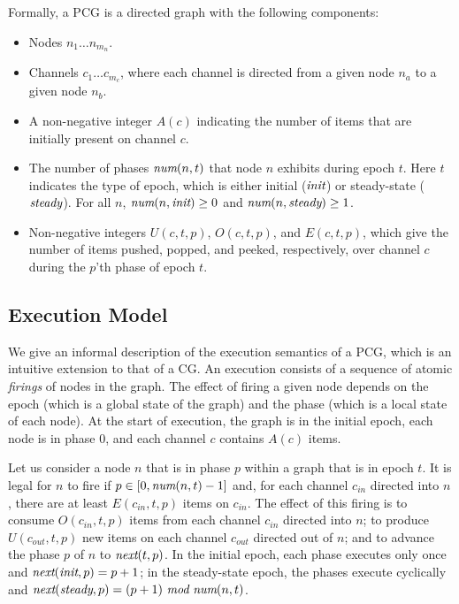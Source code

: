 Formally, a PCG is a directed graph with the following components:
\begin{itemize}

\item Nodes $n_1 \dots n_{m_n}$.

\item Channels $c_1 \dots c_{m_c}$, where each channel is directed
from a given node $n_a$ to a given node $n_b$.

\item A non-negative integer $A(c)$ indicating the number of items
  that are initially present on channel $c$.

\item The number of phases $\mbox{\it num}(n, t)$ that node $n$ exhibits
during epoch $t$.  Here $t$ indicates the type of epoch, which is
either initial ($\mbox{\it init}$) or steady-state ($\mbox{\it steady}$).  For all
$n$, $\mbox{\it num}(n, \mbox{\it init}) \ge 0$ and $\mbox{\it num}(n, \mbox{\it steady}) \ge
1$.

\item Non-negative integers $U(c, t, p)$, $O(c, t, p)$, and $E(c, t,
p)$, which give the number of items pushed, popped, and peeked,
respectively, over channel $c$ during the $p$'th phase of epoch $t$.

\end{itemize}

\subsection{Execution Model}

We give an informal description of the execution semantics of a PCG,
which is an intuitive extension to that of a CG.  An execution
consists of a sequence of atomic {\it firings} of nodes in the graph.
The effect of firing a given node depends on the epoch (which is a
global state of the graph) and the phase (which is a local state of
each node). At the start of execution, the graph is in the initial
epoch, each node is in phase 0, and each channel $c$ contains $A(c)$
items.

Let us consider a node $n$ that is in phase $p$ within a graph that is
in epoch $t$.  It is legal for $n$ to fire if $p \in [0, \mbox{\it num}(n,
t)-1]$ and, for each channel $c_{in}$ directed into $n$, there are at
least $E(c_{in}, t, p)$ items on $c_{in}$.  The effect of this firing
is to consume $O(c_{in}, t, p)$ items from each channel $c_{in}$
directed into $n$; to produce $U(c_{out}, t, p)$ new items on each
channel $c_{out}$ directed out of $n$; and to advance the phase $p$ of
$n$ to $\mbox{\it next}(t, p)$.  In the initial epoch, each phase executes
only once and $\mbox{\it next}(\mbox{\it init}, p) = p + 1$; in the
steady-state epoch, the phases execute cyclically and
$\mbox{\it next}(\mbox{\it steady}, p) = (p + 1)~\mbox{\it mod}~\mbox{\it num}(n, t)$.

